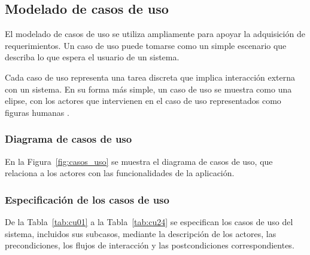 \subsection{Modelado de casos de uso}
El modelado de casos de uso se utiliza ampliamente para apoyar la adquisición de requerimientos. Un caso de uso puede tomarse como un simple escenario que describa lo que espera el usuario de un sistema.

Cada caso de uso representa una tarea discreta que implica interacción externa con un sistema. En su forma más simple, un caso de uso se muestra como una elipse, con los actores que intervienen en el caso de uso representados como figuras humanas \cite{sommerville2015software}. 

\subsubsection{Diagrama de casos de uso }

En la Figura~\ref{fig:casos_uso} se muestra el diagrama de casos de uso, que relaciona a los actores con las funcionalidades de la aplicación.



\subsubsection{Especificación de los casos de uso}

De la Tabla~\ref{tab:cu01} a la Tabla~\ref{tab:cu24} se especifican los casos de uso del sistema, incluidos sus subcasos, mediante la descripción de los actores, las precondiciones, los flujos de interacción y las postcondiciones correspondientes.

